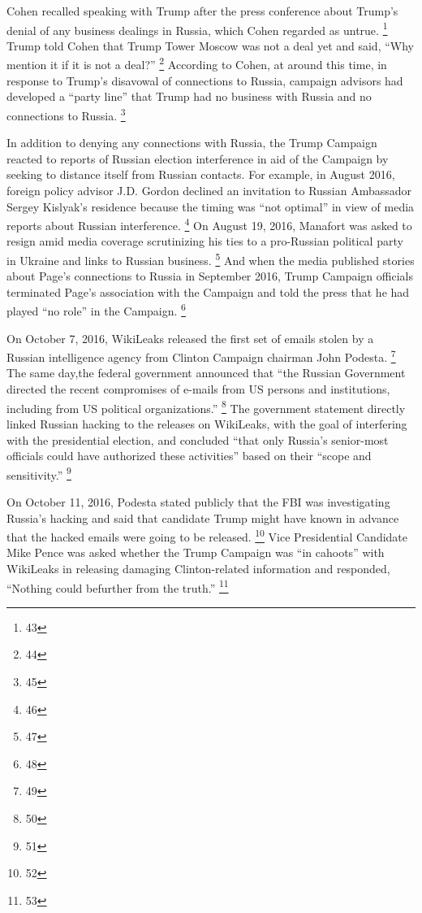 Cohen recalled speaking with Trump after the press conference about Trump's denial of any business dealings in Russia, which Cohen regarded as untrue.%
\footnote{43}
Trump told Cohen that Trump Tower Moscow was not a deal yet and said, ``Why mention it  if it is not a deal?''%
\footnote{44}
According to Cohen, at around this time, in response to Trump's disavowal of connections to Russia, campaign advisors had developed a ``party line'' that Trump had no business with Russia and no connections to Russia.%
\footnote{45}

In addition to denying any connections with Russia, the Trump Campaign reacted to reports of Russian election interference in aid of the Campaign by seeking to distance itself from Russian contacts. 
For example, in August 2016, foreign policy advisor J.D. Gordon declined an invitation to Russian Ambassador Sergey Kislyak's residence because the timing was ``not optimal'' in view of media reports about Russian interference.%
\footnote{46}
On August 19, 2016, Manafort was asked to resign amid media coverage scrutinizing his ties to a pro-Russian political party in Ukraine and links to Russian business.%
\footnote{47}
And when the media published stories about Page's connections to Russia in September 2016, Trump Campaign officials terminated Page's association with the Campaign and told the press that he had played ``no role'' in the Campaign.%
\footnote{48}

On October 7, 2016, WikiLeaks released the first set of emails stolen by a Russian intelligence agency from Clinton Campaign chairman John Podesta.%
\footnote{49}
The same day,the federal government announced that ``the Russian Government directed the recent compromises of e-mails from US persons and institutions, including from US political organizations.''%
\footnote{50}
The government statement directly linked Russian hacking to the releases on WikiLeaks, with the goal of interfering with the presidential election, and concluded ``that only Russia's senior-most officials could have authorized these activities'' based on their ``scope and sensitivity.''%
\footnote{51}

On October 11, 2016, Podesta stated publicly that the FBI was investigating Russia's hacking and said that candidate Trump might have known in advance that the hacked emails were going to be released.%
\footnote{52}
Vice Presidential Candidate Mike Pence was asked whether the Trump Campaign was ``in cahoots'' with WikiLeaks in releasing damaging Clinton-related information and responded, ``Nothing could befurther from the truth.''%
\footnote{53}

